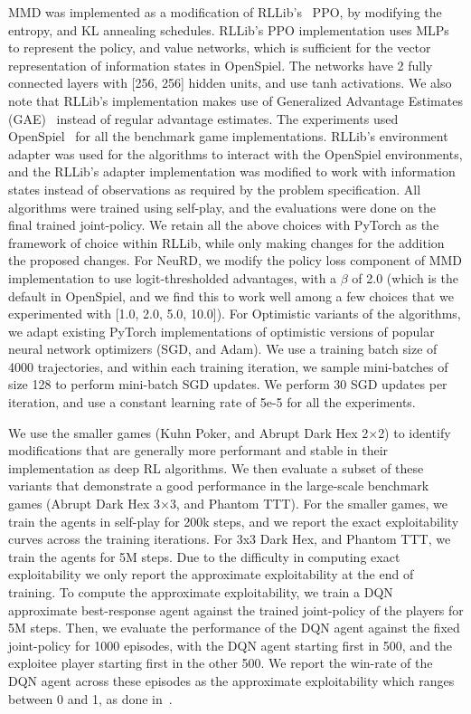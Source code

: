 MMD was implemented as a modification of RLLib's~\cite{liangRLlib2018} PPO, by modifying the
entropy, and KL annealing schedules.
RLLib's PPO implementation uses MLPs to represent the policy, and value networks, which is
sufficient for the vector representation of information states in OpenSpiel.
The networks have 2 fully connected layers with [256, 256] hidden units, and use tanh activations.
We also note that RLLib's implementation makes use of Generalized Advantage Estimates
(GAE)~\cite{schulmanHighDimensional2018} instead of regular advantage estimates.
The experiments used OpenSpiel~\cite{lanctotOpenSpiel2020} for all the benchmark game
implementations.
RLLib's environment adapter was used for the algorithms to interact with the OpenSpiel
environments, and the RLLib's adapter implementation was modified to work with information states
instead of observations as required by the problem specification.
All algorithms were trained using self-play, and the evaluations were done on the final trained
joint-policy.
We retain all the above choices with PyTorch as the framework of choice within RLLib, while only
making changes for the addition the proposed changes.
For NeuRD, we modify the policy loss component of MMD implementation to use logit-thresholded
advantages, with a $\beta$ of 2.0 (which is the default in OpenSpiel, and we find this to work well
among a few choices that we experimented with [1.0, 2.0, 5.0, 10.0]).
For Optimistic variants of the algorithms, we adapt existing PyTorch implementations of optimistic
versions of popular neural network optimizers (SGD, and Adam).
We use a training batch size of 4000 trajectories, and within each training iteration, we sample
mini-batches of size 128 to perform mini-batch SGD updates.
We perform 30 SGD updates per iteration, and use a constant learning rate of 5e-5 for all the
experiments.

We use the smaller games (Kuhn Poker, and Abrupt Dark Hex 2$\times$2) to identify modifications
that are generally more performant and stable in their implementation as deep RL algorithms.
We then evaluate a subset of these variants that demonstrate a good performance in the large-scale
benchmark games (Abrupt Dark Hex 3$\times$3, and Phantom TTT).
For the smaller games, we train the agents in self-play for 200k steps, and we report the exact
exploitability curves across the training iterations.
For 3x3 Dark Hex, and Phantom TTT, we train the agents for 5M steps.
Due to the difficulty in computing exact exploitability we only report the approximate
exploitability at the end of training.
To compute the approximate exploitability, we train a DQN approximate best-response agent against
the trained joint-policy of the players for 5M steps.
Then, we evaluate the performance of the DQN agent against the fixed joint-policy for 1000
episodes, with the DQN agent starting first in 500, and the exploitee player starting first in the
other 500.
We report the win-rate of the DQN agent across these episodes as the approximate exploitability
which ranges between 0 and 1, as done in~\cite{sokotaUnified2023}.

